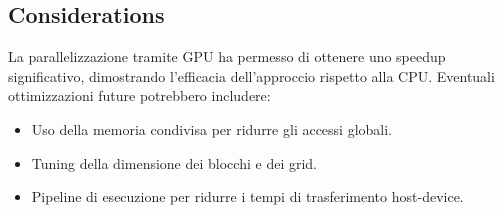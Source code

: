 \subsection{Considerations}
La parallelizzazione tramite GPU ha permesso di ottenere uno speedup significativo, dimostrando l'efficacia dell'approccio rispetto alla CPU.  
Eventuali ottimizzazioni future potrebbero includere:
\begin{itemize}
    \item Uso della memoria condivisa per ridurre gli accessi globali.
    \item Tuning della dimensione dei blocchi e dei grid.
    \item Pipeline di esecuzione per ridurre i tempi di trasferimento host-device.
\end{itemize}

